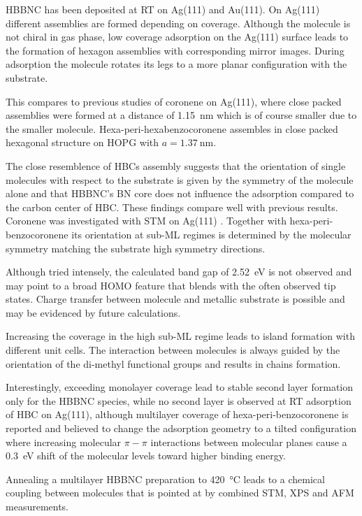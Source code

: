 HBBNC has been deposited at RT on Ag(111) and Au(111). On Ag(111) different assemblies are formed depending on coverage. Although the molecule is not chiral in gas phase, low coverage adsorption on the Ag(111) surface leads to the formation of hexagon assemblies with corresponding mirror images. During adsorption the molecule rotates its legs to a more planar configuration with the substrate. 

This compares to previous studies of coronene on Ag(111), where close packed assemblies were formed at a distance of \SI{1.15}{\nano \meter} which is of course smaller due to the smaller molecule.\cite{lackinger_coronene_2002} Hexa-peri-hexabenzocoronene assembles in close packed hexagonal structure on HOPG with $a =\SI{1,37}{\nano \meter}$.\cite{samori_epitaxial_2002}

The close resemblence of HBCs assembly suggests that the orientation of single molecules with respect to the substrate is given by the symmetry of the molecule alone and that HBBNC's BN core does not influence the adsorption compared to the carbon center of HBC. These findings compare well with previous results. Coronene was investigated with STM on Ag(111) \cite{lackinger_coronene_2002, mckinnon_observation_1995}. Together with hexa-peri-benzocoronene its orientation at sub-ML regimes is determined by the molecular symmetry matching the substrate high symmetry directions\cite{zimmermann_epitaxial_1992}.

Although tried intensely, the calculated band gap of \SI{2.52}{\eV} is not observed and may point to a broad HOMO feature that blends with the often observed tip states.
Charge transfer between molecule and metallic substrate is possible and may be evidenced by future calculations.

Increasing the coverage in the high sub-ML regime leads to island formation with different unit cells. The interaction between molecules is always guided by the orientation of the di-methyl functional groups and results in chains formation.

Interestingly, exceeding monolayer coverage lead to stable second layer formation only for the HBBNC species, while no second layer is observed at RT adsorption of HBC on Ag(111), although multilayer coverage of hexa-peri-benzocoronene is reported and believed to change the adsorption geometry to a tilted configuration\cite{zimmermann_epitaxial_1992} where increasing molecular $\pi-\pi$ interactions between molecular planes cause a \SI{0,3}{\eV} shift of the molecular levels toward higher binding energy\cite{glowatzki_hexa-_2008}.

Annealing a multilayer HBBNC preparation to \SI{420}{\celsius} leads to a chemical coupling between molecules that is pointed at by combined STM, XPS and AFM measurements. 
